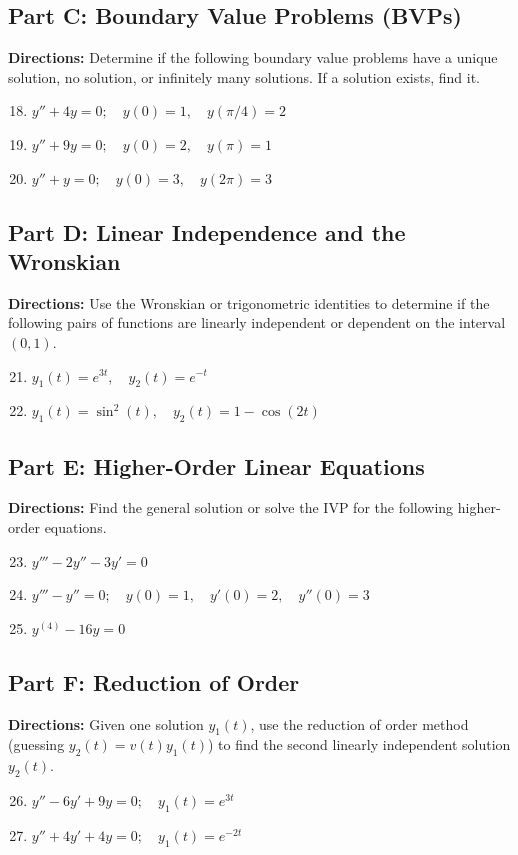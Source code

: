 \documentclass[11pt]{article}
\begin{document}
\subsection*{Part C: Boundary Value Problems (BVPs)}
\textbf{Directions:} Determine if the following boundary value problems have a unique solution, no solution, or infinitely many solutions. If a solution exists, find it.
\begin{enumerate}
    \setcounter{enumi}{17}
    \item $y'' + 4y = 0; \quad y(0) = 1, \quad y(\pi/4) = 2$
    \item $y'' + 9y = 0; \quad y(0) = 2, \quad y(\pi) = 1$
    \item $y'' + y = 0; \quad y(0) = 3, \quad y(2\pi) = 3$
\end{enumerate}

\subsection*{Part D: Linear Independence and the Wronskian}
\textbf{Directions:} Use the Wronskian or trigonometric identities to determine if the following pairs of functions are linearly independent or dependent on the interval $(0, 1)$.
\begin{enumerate}
    \setcounter{enumi}{20}
    \item $y_1(t) = e^{3t}, \quad y_2(t) = e^{-t}$
    \item $y_1(t) = \sin^2(t), \quad y_2(t) = 1 - \cos(2t)$
\end{enumerate}

\subsection*{Part E: Higher-Order Linear Equations}
\textbf{Directions:} Find the general solution or solve the IVP for the following higher-order equations.
\begin{enumerate}
    \setcounter{enumi}{22}
    \item $y''' - 2y'' - 3y' = 0$
    \item $y''' - y'' = 0; \quad y(0) = 1, \quad y'(0) = 2, \quad y''(0) = 3$
    \item $y^{(4)} - 16y = 0$
\end{enumerate}

\subsection*{Part F: Reduction of Order}
\textbf{Directions:} Given one solution $y_1(t)$, use the reduction of order method (guessing $y_2(t) = v(t)y_1(t)$) to find the second linearly independent solution $y_2(t)$.
\begin{enumerate}
    \setcounter{enumi}{25}
    \item $y'' - 6y' + 9y = 0; \quad y_1(t) = e^{3t}$
    \item $y'' + 4y' + 4y = 0; \quad y_1(t) = e^{-2t}$
\end{enumerate}
\end{document}

